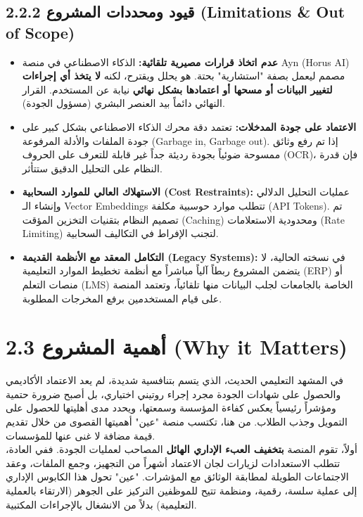 \documentclass[12pt, a4paper]{report}
\begin{document}
\begin{english}
\subsection*{2.2.2 قيود ومحددات المشروع (Limitations & Out of Scope)}
\begin{itemize}
\item \textbf{عدم اتخاذ قرارات مصيرية تلقائية:} الذكاء الاصطناعي في منصة Ayn (Horus AI) مصمم ليعمل بصفة "استشارية" بحتة. هو يحلل ويقترح، لكنه \textbf{لا يتخذ أي إجراءات لتغيير البيانات أو مسحها أو اعتمادها بشكل نهائي} نيابة عن المستخدم. القرار النهائي دائماً بيد العنصر البشري (مسؤول الجودة).
\item \textbf{الاعتماد على جودة المدخلات:} تعتمد دقة محرك الذكاء الاصطناعي بشكل كبير على جودة الملفات والأدلة المرفوعة (Garbage in, Garbage out). إذا تم رفع وثائق ممسوحة ضوئياً بجودة رديئة جداً غير قابلة للتعرف على الحروف (OCR)، فإن قدرة النظام على التحليل الدقيق ستتأثر.
\item \textbf{الاستهلاك العالي للموارد السحابية (Cost Restraints):} عمليات التحليل الدلالي وإنشاء الـ Vector Embeddings تتطلب موارد حوسبية مكلفة (API Tokens). تم تصميم النظام بتقنيات التخزين المؤقت (Caching) ومحدودية الاستعلامات (Rate Limiting) لتجنب الإفراط في التكاليف السحابية.
\item \textbf{التكامل المعقد مع الأنظمة القديمة (Legacy Systems):} في نسخته الحالية، لا يتضمن المشروع ربطاً آلياً مباشراً مع أنظمة تخطيط الموارد التعليمية (ERP) أو منصات التعلم (LMS) الخاصة بالجامعات لجلب البيانات منها تلقائياً، وتعتمد المنصة على قيام المستخدمين برفع المخرجات المطلوبة.
\end{itemize}

\section*{2.3 أهمية المشروع (Why it Matters)}

في المشهد التعليمي الحديث، الذي يتسم بتنافسية شديدة، لم يعد الاعتماد الأكاديمي والحصول على شهادات الجودة مجرد إجراء روتيني اختياري، بل أصبح ضرورة حتمية ومؤشراً رئيسياً يعكس كفاءة المؤسسة وسمعتها، ويحدد مدى أهليتها للحصول على التمويل وجذب الطلاب. من هنا، تكتسب منصة "عين" أهميتها القصوى من خلال تقديم قيمة مضافة لا غنى عنها للمؤسسات. \\

أولاً، تقوم المنصة \textbf{بتخفيف العبء الإداري الهائل} المصاحب لعمليات الجودة. ففي العادة، تتطلب الاستعدادات لزيارات لجان الاعتماد أشهراً من التجهيز، وجمع الملفات، وعقد الاجتماعات الطويلة لمطابقة الوثائق مع المؤشرات. "عين" تحول هذا الكابوس الإداري إلى عملية سلسة، رقمية، ومنظمة تتيح للموظفين التركيز على الجوهر (الارتقاء بالعملية التعليمية) بدلاً من الانشغال بالإجراءات المكتبية. \\


\end{english}
\end{document}
